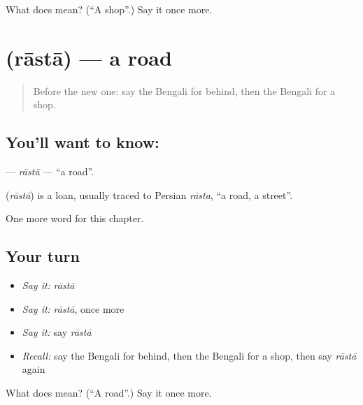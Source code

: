 \begin{tcolorbox}[breakable,colback=teal!4,colframe=teal!35!black,title={Before you move on}]
What does  mean? (\textquotedblleft{}A shop\textquotedblright{}.) Say it once more.
\end{tcolorbox}
\section[\texorpdfstring{\bn{রাস্তা} (rāstā)}{রাস্তা (rāstā)}]{ (rāstā) — a road}

\label{lesson:BN-C82-rasta}



\begin{quote}
Before the new one: say the Bengali for behind, then the Bengali for a shop.
\end{quote}

\subsection*{You'll want to know: }
\textbf{} — \emph{rāstā} — \textquotedblleft{}a road\textquotedblright{}.

\begin{cousinweb}
\textbf{} (\emph{rāstā}) is a loan, usually traced to Persian \emph{rāsta}, \textquotedblleft{}a road, a street\textquotedblright{}.
\end{cousinweb}

\begin{grammarlens}[title={What you've built}]
One more word for this chapter.
\end{grammarlens}

\subsection*{Your turn}
\begin{itemize}
\raggedright
  \item \emph{Say it:} \emph{rāstā}
  \item \emph{Say it:} \emph{rāstā}, once more
  \item \emph{Say it:} say \emph{rāstā}
  \item \emph{Recall:} say the Bengali for behind, then the Bengali for a shop, then say \emph{rāstā} again
\end{itemize}

\begin{tcolorbox}[breakable,colback=teal!4,colframe=teal!35!black,title={Before you move on}]
What does  mean? (\textquotedblleft{}A road\textquotedblright{}.) Say it once more.
\end{tcolorbox}
